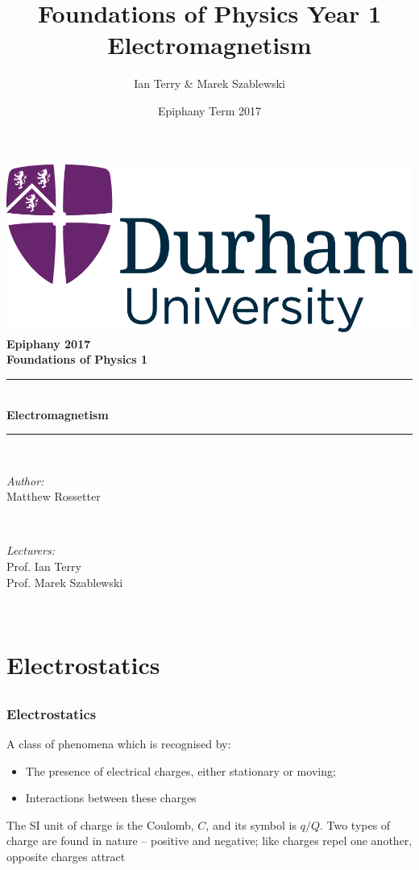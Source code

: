 \documentclass[a4paper, 11pt, normalem]{report}
\title{Foundations of Physics Year 1 \\ Electromagnetism \vspace{-20pt}}
\author{Ian Terry \& Marek Szablewski}
\date{\vspace{-15pt}Epiphany Term 2017}
\begin{document}
\begin{titlepage}
    \newcommand{\HRule}{\rule{\linewidth}{0.5mm}}
    \center
    {\includegraphics[scale=0.5]{../../logo0.png}\hfill{\Large\bfseries Epiphany 2017}}\\[2.5cm]
    {\LARGE\bfseries Foundations of Physics 1}\\[1.5cm]
    \HRule \\[0.7cm]
    {\huge\bfseries Electromagnetism}\\[0.4cm]
    \HRule \\[1.5cm]

    \begin{minipage}{0.4\textwidth}
        \begin{flushleft} \large
            \emph{Author:} \\ Matthew Rossetter
        \end{flushleft}
    \end{minipage}~
    \begin{minipage}{0.4\textwidth}
        \begin{flushright} \large
            \emph{Lecturers:} \\ Prof. Ian Terry \\  Prof. Marek Szablewski
        \end{flushright}
    \end{minipage}\\[2cm]
    \vfill
\end{titlepage}
\tableofcontents

\part{Electrostatics}
\chapter{}
\section{Electrostatics}
A class of phenomena which is recognised by:
\begin{itemize}
    \item The presence of electrical charges, either stationary or moving;
    \item Interactions between these charges
\end{itemize}
The SI unit of charge is the Coulomb, $C$, and its symbol is $q/Q$.
Two types of charge are found in nature -- positive and negative; like charges repel one another, opposite charges attract
\end{document}
